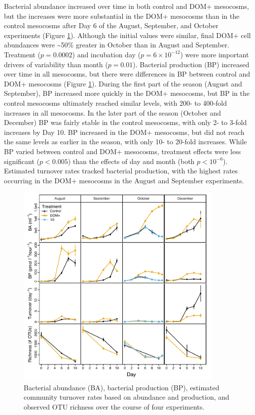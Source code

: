 Bacterial abundance increased over time in both control and DOM+ mesocosms, but the increases were more substantial in the DOM+ mesocosms than in the control mesocosms after Day 6 of the August, September, and October experiments (Figure \ref{fig:ch3:BA_BP_Turnover_Richness}). Although the initial values were similar, final DOM+ cell abundances were \textasciitilde{}50\% greater in October than in August and September. Treatment ($p = 0.0002$) and incubation day ($p = 6 \times 10^{-12}$) were more important drivers of variability than month ($p = 0.01$). Bacterial production (BP) increased over time in all mesocosms, but there were differences in BP between control and DOM+ mesocosms (Figure \ref{fig:ch3:BA_BP_Turnover_Richness}). During the first part of the season (August and September), BP increased more quickly in the DOM+ mesocosms, but BP in the control mesocosms ultimately reached similar levels, with 200- to 400-fold increases in all mesocosms. In the later part of the season (October and December) BP was fairly stable in the control mesocosms, with only 2- to 3-fold increases by Day 10. BP increased in the DOM+ mesocosms, but did not reach the same levels as earlier in the season, with only 10- to 20-fold increases. While BP varied between control and DOM+ mesocosms, treatment effects were less significant ($p < 0.005$) than the effects of day and month (both $p < 10^{-6}$). Estimated turnover rates tracked bacterial production, with the highest rates occurring in the DOM+ mesocosms in the August and September experiments.


\begin{figure}[ht!] 
\centering 
\includegraphics[width=0.9\textwidth]{Chapter_4_DOM/Figures/Figure_2_BA_BP_Turnover_Richness}
\caption[Bacterial abundance, bacterial production, estimated community turnover rates, and OTU richness over the course of four experiments.]{Bacterial abundance (BA), bacterial production (BP), estimated community turnover rates based on abundance and production, and observed OTU richness over the course of four experiments.} 
\label{fig:ch3:BA_BP_Turnover_Richness} 
\end{figure}


